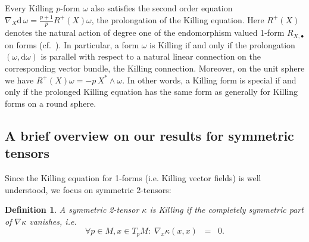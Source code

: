 \documentclass[11pt,a4paper]{article}
\theoremstyle{plain}
\newtheorem{definition}{Definition}
\theoremstyle{remark}
\renewcommand{\d}{\mathrm{d}}
\begin{document}
Every Killing $p$-form $\omega$ also satisfies the second order equation $\nabla_X\d\, \omega = \frac{p+1}{p}R^+(X)\omega$, the prolongation of the Killing equation. Here $R^+(X)$ denotes the natural action of degree one  of the endomorphism valued 1-form $R_{X,\bullet}$ on forms (cf.~\cite[Chapter~4]{Se}). In particular, a form $\omega$ is Killing if and only if
the prolongation $(\omega,\d \omega)$ is parallel with respect to a natural linear connection on the corresponding vector bundle, the Killing
connection. Moreover, on the unit sphere we have $R^+(X)\omega = - p\,X^*\wedge \omega$. In other words, a Killing form is special if and only if the prolonged Killing
equation has the same form as generally for Killing forms on a round sphere. 



\subsection{A brief overview on our results for symmetric tensors}
Since the Killing equation for 1-forms (i.e. Killing vector fields) is well understood, we focus on symmetric 2-tensors:

\bigskip
\begin{definition}
A symmetric 2-tensor $\kappa$ is Killing if the completely symmetric
part of $\nabla\kappa$ vanishes, i.e.
\begin{equation}\label{eq:def_Killing}
\forall p\in M,x\in T_pM:\;\nabla_x\kappa(x,x)\;\;=\;\;0.
\end{equation}
\end{definition}
\end{document}
